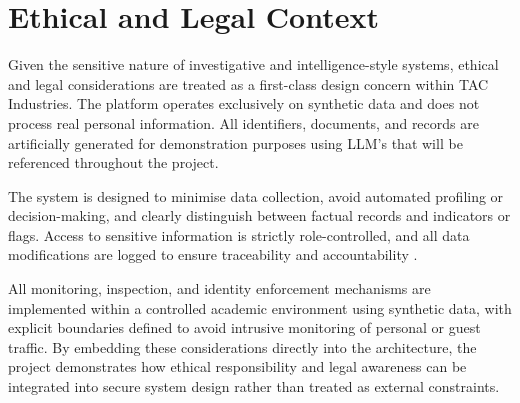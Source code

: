 \section{Ethical and Legal Context}

Given the sensitive nature of investigative and intelligence-style systems, ethical and legal considerations are treated as a first-class design concern within TAC Industries. The platform operates exclusively on synthetic data and does not process real personal information. All identifiers, documents, and records are artificially generated for demonstration purposes using LLM's that will be referenced throughout the project.

The system is designed to minimise data collection, avoid automated profiling or decision-making, and clearly distinguish between factual records and indicators or flags. Access to sensitive information is strictly role-controlled, and all data modifications are logged to ensure traceability and accountability \cite{gdpr2016}.

All monitoring, inspection, and identity enforcement mechanisms are implemented within a controlled academic environment using synthetic data, with explicit boundaries defined to avoid intrusive monitoring of personal or guest traffic. By embedding these considerations directly into the architecture, the project demonstrates how ethical responsibility and legal awareness can be integrated into secure system design rather than treated as external constraints.